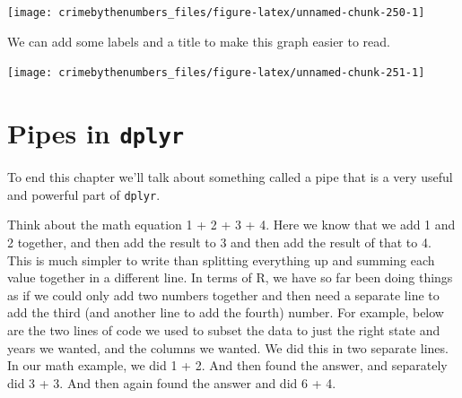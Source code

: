 \documentclass[
]{krantz}
\makeatletter
\newenvironment{Shaded}{\begin{snugshade}}{\end{snugshade}}
\newcommand{\AttributeTok}[1]{\textcolor[rgb]{0.61,0.61,0.61}{#1}}
\newcommand{\FunctionTok}[1]{\textcolor[rgb]{0,0,0}{#1}}
\newcommand{\NormalTok}[1]{#1}
\newcommand{\SpecialCharTok}[1]{\textcolor[rgb]{0,0,0}{#1}}
\newcommand{\StringTok}[1]{\textcolor[rgb]{0.5,0.5,0.5}{#1}}
\newenvironment{kframe}{%
\medskip{}
\setlength{\fboxsep}{.8em}
 \def\at@end@of@kframe{}%
 \ifinner\ifhmode%
  \def\at@end@of@kframe{\end{minipage}}%
  \begin{minipage}{\columnwidth}%
 \fi\fi%
 \def\FrameCommand##1{\hskip\@totalleftmargin \hskip-\fboxsep
 \colorbox{shadecolor}{##1}\hskip-\fboxsep
     \hskip-\linewidth \hskip-\@totalleftmargin \hskip\columnwidth}%
 \MakeFramed {\advance\hsize-\width
   \@totalleftmargin\z@ \linewidth\hsize
   \@setminipage}}%
 {\par\unskip\endMakeFramed%
 \at@end@of@kframe}
\renewenvironment{Shaded}{\begin{kframe}}{\end{kframe}}
\makeatother
\begin{document}
\begin{Shaded}
\end{Shaded}

\begin{center}\texttt{[image: crimebythenumbers\_files/figure-latex/unnamed-chunk-250-1]} \end{center}

We can add some labels and a title to make this graph easier to read.

\begin{Shaded}
\end{Shaded}

\begin{center}\texttt{[image: crimebythenumbers\_files/figure-latex/unnamed-chunk-251-1]} \end{center}

\hypertarget{dplyr-pipes}{%
\section{\texorpdfstring{Pipes in \texttt{dplyr}}{Pipes in dplyr}}\label{dplyr-pipes}}

To end this chapter we'll talk about something called a pipe that is a very useful and powerful part of \texttt{dplyr}.

Think about the math equation 1 + 2 + 3 + 4. Here we know that we add 1 and 2 together, and then add the result to 3 and then add the result of that to 4. This is much simpler to write than splitting everything up and summing each value together in a different line. In terms of R, we have so far been doing things as if we could only add two numbers together and then need a separate line to add the third (and another line to add the fourth) number. For example, below are the two lines of code we used to subset the data to just the right state and years we wanted, and the columns we wanted. We did this in two separate lines. In our math example, we did 1 + 2. And then found the answer, and separately did 3 + 3. And then again found the answer and did 6 + 4.
\end{document}
